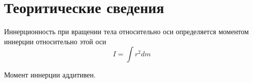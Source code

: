 \section{Теоритические сведения}
Иннерционность при вращении тела относительно оси определяется моментом иннерции
относительно этой оси
\[I=\int r^2dm\]

Момент иннерции аддитивен.
